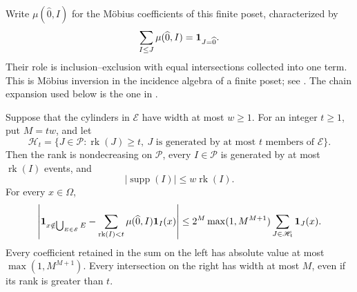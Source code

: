 Write $\mu(\widehat0,I)$ for the M\"obius coefficients of this finite
poset, characterized by
\[
 \sum_{I\le J}\mu(\widehat0,I)=\mathbf 1_{J=\widehat0}.
\]
Their role is inclusion--exclusion with equal intersections collected
into one term.  This is M\"obius inversion in the incidence algebra of a
finite poset; see \cite[Section~3]{Rota1964}.  The chain expansion used
below is the one in \cite[Section~3, Proposition~6]{Rota1964}.

\begin{lemma}\label{lem:cylinder-truncation}
Suppose that the cylinders in $\mathscr E$ have width at most $w\ge1$.
For an integer $t\ge1$, put $M=tw$, and let
\[
 \mathscr H_t=\{J\in\mathscr P:\operatorname{rk}(J)\ge t,
       \ J\text{ is generated by at most }t\text{ members of }\mathscr E\}.
\]
Then the rank is nondecreasing on $\mathscr P$, every $I\in\mathscr P$
is generated by at most $\operatorname{rk}(I)$ events, and
\begin{equation}\label{eq:cylinder-width}
 |\operatorname{supp}(I)|\le w\operatorname{rk}(I).
\end{equation}
For every $x\in\Omega$,
\begin{equation}\label{eq:cylinder-truncation}
 \left|\mathbf 1_{x\notin\bigcup_{E\in\mathscr E}E}
       -\sum_{\operatorname{rk}(I)<t}\mu(\widehat0,I)\mathbf 1_I(x)\right|
 \le 2^M\max(1,M^{M+1})\sum_{J\in\mathscr H_t}\mathbf 1_J(x).
\end{equation}
Every coefficient retained in the sum on the left has absolute value
at most $\max(1,M^{M+1})$.  Every intersection on the right has width
at most $M$, even if its rank is greater than $t$.
\end{lemma}

